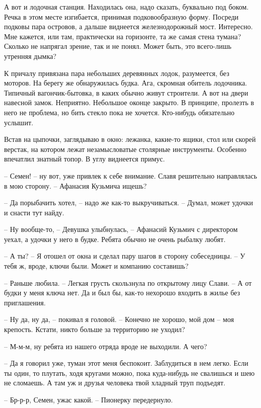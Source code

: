 \documentclass[a4paper]{book}
\begin{document}
А вот и лодочная станция. Находилась она, надо сказать, буквально под боком.  Речка в этом месте изгибается, принимая подковообразную форму. Посреди подковы пара островов, а дальше виднеется железнодорожный мост. Интересно. Мне кажется, или там, практически на горизонте, та же самая стена тумана? Сколько не напрягал зрение, так и не понял. Может быть, это всего-лишь утренняя дымка? 

К причалу привязана пара небольших деревянных лодок, разумеется, без моторов. На берегу же обнаружилась будка. Ага, скромная обитель лодочника. Типичный вагончик-бытовка, в каких обычно живут строители. А вот на двери навесной замок. Неприятно. Небольшое оконце закрыто. В принципе, пролезть в него не проблема, но бить стекло пока не хочется.  Кто-нибудь обязательно услышит. 

Встав на цыпочки, заглядываю в окно: лежанка, какие-то ящики, стол или скорей верстак, на котором лежат незамысловатые столярные инструменты. Особенно впечатлил  знатный топор. В углу виднеется примус. 

-- Семен! -- ну вот, уже привлек к себе внимание. Славя решительно направлялась в мою сторону. -- Афанасия Кузьмича ищешь?

-- Да порыбачить хотел, -- надо же как-то выкручиваться. -- Думал, может удочки и снасти тут найду. 

-- Ну вообще-то, -- Девушка  улыбнулась, -- Афанасий Кузьмич с директором уехал, а удочки у него в будке. Ребята обычно не очень рыбалку любят.

-- А ты? -- Я отошел от окна и сделал пару шагов в сторону собеседницы. -- У тебя ж, вроде, ключи были. Может и компанию составишь?

-- Раньше любила. -- Легкая грусть скользнула по открытому лицу Слави. -- А от будки у меня ключа нет. Да и был бы, как-то нехорошо входить в жилье без приглашения. 

-- Ну да, ну да, -- покивал я головой. -- Конечно не хорошо, мой дом -- моя крепость. Кстати, никто больше за территорию не уходил?

-- М-м-м, ну ребята из нашего отряда вроде не выходили. А чего? 

-- Да я говорил уже, туман этот меня беспокоит. Заблудиться в нем легко. Если ты один, то плутать, ходя кругами можно, пока куда-нибудь не свалишься и шею не сломаешь. А там уж и друзья человека твой хладный труп подъедят. 

-- Бр-р-р, Семен, ужас какой. -- Пионерку передернуло. 
\end{document}
